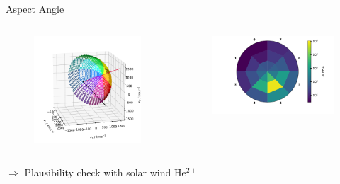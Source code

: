 \documentclass{beamer}
\begin{document}
\begin{frame}{Aspect Angle}
\begin{columns}
		\begin{figure}
			\includegraphics[scale=0.4]{Pics/coll_aa.pdf}
		\end{figure}
	\column[]{7.5cm}
		\begin{figure}
			\includegraphics[scale=0.4]{Pics/hist_det_sec_aa_90days2001.pdf}
		\end{figure}
\end{columns}
$\Rightarrow$ Plausibility check with solar wind $\mathrm{He^{2+}}$
\end{frame}
\end{document}
